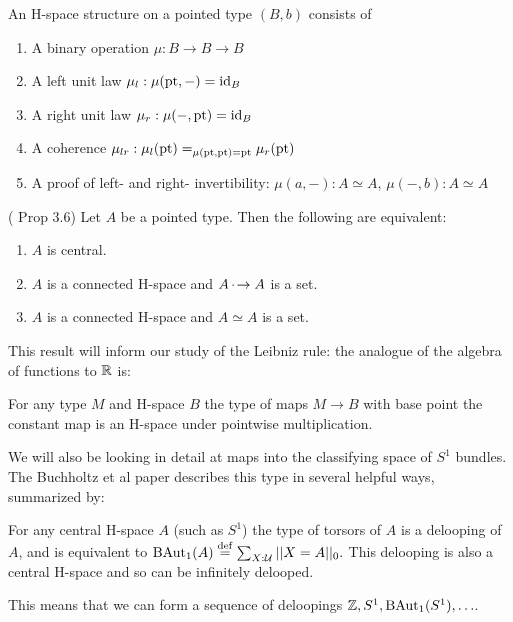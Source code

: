 \begin{mydef}
An H-space structure on a pointed type \( (B,b) \) consists of
\begin{enumerate}
\item A binary operation \( \mu:B\to B\to B \)
\item A left unit law \( \mu_l:\mu(\mathrm{pt},-)=\text{id}_B \)
\item A right unit law \( \mu_r:\mu(-,\mathrm{pt})=\text{id}_B \)
\item A coherence \( \mu_{lr}:\mu_l(\mathrm{pt})=_{\mu(\mathrm{pt},\mathrm{pt})=\mathrm{pt}}\mu_r(\mathrm{pt}) \)
\item A proof of left- and right- invertibility: \( \mu(a,-):A\simeq A \), \( \mu(-, b):A\simeq A \)
\end{enumerate}
\end{mydef}

\begin{myprop}
(\cite{buchholtz2023central} Prop 3.6) Let \( A \) be a pointed type. Then the following are equivalent:
\begin{enumerate}
\item \( A \) is central.
\item \( A \) is a connected H-space and \( A\,\cdot\!\to A \) is a set.
\item \( A \) is a connected H-space and \( A\simeq A \) is a set.
\end{enumerate}
\end{myprop}

This result will inform our study of the Leibniz rule: the analogue of the algebra of functions to \( \mathbb{R} \) is:
\begin{myprop}
For any type \( M \) and H-space \( B \) the type of maps \( M\to B \) with base point the constant map is an H-space under pointwise multiplication.
\end{myprop}

We will also be looking in detail at maps into the classifying space of \( S^1 \) bundles. The Buchholtz et al paper\cite{buchholtz2023central} describes this type in several helpful ways, summarized by:

\begin{mythm}
For any central H-space \( A \) (such as \( S^1 \)) the type of torsors of \( A \) is a delooping of \( A \), and is equivalent to \( \mathrm{BAut}_1(A)\stackrel{\mathrm{def}}{=} \sum_{X:\mathcal{U}}||X=A||_0. \) This delooping is also a central H-space and so can be infinitely delooped.
\end{mythm}

This means that we can form a sequence of deloopings \( \mathbb{Z}, S^1, \mathrm{BAut}_1(S^1), \ldots \).



